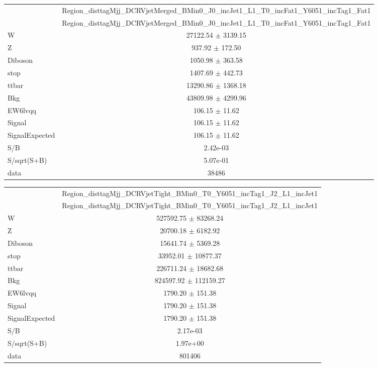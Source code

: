 \documentclass{article}
\begin{document}
\begin{table}
\centering
\small
\begin{tabular}{l|c|}
\cline{2-2}
 & \multicolumn{1}{c|}{Region\_disttagMjj\_DCRVjetMerged\_BMin0\_J0\_incJet1\_L1\_T0\_incFat1\_Y6051\_incTag1\_Fat1}\\
\cline{2-2}
 & \multicolumn{1}{c|}{Region\_disttagMjj\_DCRVjetMerged\_BMin0\_J0\_incJet1\_L1\_T0\_incFat1\_Y6051\_incTag1\_Fat1}\\ \hline
W & 27122.54 $\pm$ 3139.15\\
Z & 937.92 $\pm$ 172.50\\
Diboson & 1050.98 $\pm$ 363.58\\
stop & 1407.69 $\pm$ 442.73\\
ttbar & 13290.86 $\pm$ 1368.18\\
\hline
Bkg & 43809.98 $\pm$ 4299.96\\
\hline
EW6lvqq & 106.15 $\pm$ 11.62\\
\hline
Signal & 106.15 $\pm$ 11.62\\
SignalExpected & 106.15 $\pm$ 11.62\\
\hline
S/B & 2.42e-03\\
S/sqrt(S+B) & 5.07e-01\\
\hline
data & 38486\\ \hline
\end{tabular}
\end{table}


\begin{table}
\centering
\small
\begin{tabular}{l|c|}
\cline{2-2}
 & \multicolumn{1}{c|}{Region\_disttagMjj\_DCRVjetTight\_BMin0\_T0\_Y6051\_incTag1\_J2\_L1\_incJet1}\\
\cline{2-2}
 & \multicolumn{1}{c|}{Region\_disttagMjj\_DCRVjetTight\_BMin0\_T0\_Y6051\_incTag1\_J2\_L1\_incJet1}\\ \hline
W & 527592.75 $\pm$ 83268.24\\
Z & 20700.18 $\pm$ 6182.92\\
Diboson & 15641.74 $\pm$ 5369.28\\
stop & 33952.01 $\pm$ 10877.37\\
ttbar & 226711.24 $\pm$ 18682.68\\
\hline
Bkg & 824597.92 $\pm$ 112159.27\\
\hline
EW6lvqq & 1790.20 $\pm$ 151.38\\
\hline
Signal & 1790.20 $\pm$ 151.38\\
SignalExpected & 1790.20 $\pm$ 151.38\\
\hline
S/B & 2.17e-03\\
S/sqrt(S+B) & 1.97e+00\\
\hline
data & 801406\\ \hline
\end{tabular}
\end{table}
\end{document}
